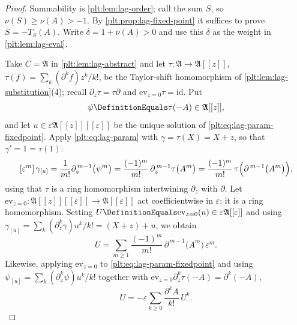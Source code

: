 \documentclass[11pt,oneside]{article}
\theoremstyle{plain}
\theoremstyle{definition}
\theoremstyle{remark}
\begin{document}
\begin{proof}
Summability is \cref{plt:lem:lag-order}; call the sum \(S\), so
\(\nu(S)\ge\nu(A)>-1\).  By \cref{plt:prop:lag-fixed-point} it suffices to
prove \(S=-T_S(A)\).  Write \(\delta=1+\nu(A)>0\) and use this \(\delta\) as
the weight in \cref{plt:lem:lag-eval}.

Take \(C=\mathfrak A\) in \cref{plt:lem:lag-abstract} and let
\(\tau\colon\mathfrak A\to\mathfrak A[[z]]\),
\(\tau(f)=\sum_k(\partial^kf)z^k/k!\), be the Taylor-shift homomorphism of
\cref{plt:lem:lag-substitution}(4); recall \(\partial_z\tau=\tau\partial\) and
\(\mathrm{ev}_{z=0}\tau=\mathrm{id}\).  Put
\[
  \psi\DefinitionEquals\tau(-A)\in\mathfrak A[[z]],
\]
and let \(u\in\varepsilon\mathfrak A[[z]][[\varepsilon]]\) be the unique solution
of \cref{plt:eq:lag-param-fixedpoint}.  Apply
\cref{plt:eq:lag-param} with \(\gamma=\tau(X)=X+z\), so that
\(\gamma'=1=\tau(1)\):
\[
  [\varepsilon^m]\,\gamma_{[u]}
  =\frac1{m!}\partial_z^{\,m-1}\bigl(\psi^m\bigr)
  =\frac{(-1)^m}{m!}\,\partial_z^{\,m-1}\tau\bigl(A^m\bigr)
  =\frac{(-1)^m}{m!}\,\tau\Bigl(\partial^{\,m-1}\bigl(A^m\bigr)\Bigr),
\]
using that \(\tau\) is a ring homomorphism intertwining \(\partial_z\) with
\(\partial\).  Let
\(\mathrm{ev}_{z=0}\colon\mathfrak A[[z]][[\varepsilon]]\to\mathfrak
A[[\varepsilon]]\) act coefficientwise in \(\varepsilon\); it is a ring
homomorphism.  Setting \(U\DefinitionEquals\mathrm{ev}_{z=0}(u)\in
\varepsilon\mathfrak A[[\varepsilon]]\) and using
\(\gamma_{[u]}=\sum_k(\partial_z^k\gamma)u^k/k!=(X+z)+u\), we obtain
\begin{equation}
\label{plt:eq:lag-U}
  U=\sum_{m\ge1}\frac{(-1)^m}{m!}\,\partial^{\,m-1}\bigl(A^m\bigr)\,\varepsilon^m .
\end{equation}
Likewise, applying \(\mathrm{ev}_{z=0}\) to
\cref{plt:eq:lag-param-fixedpoint} and using
\(\psi_{[u]}=\sum_k(\partial_z^k\psi)u^k/k!\) together with
\(\mathrm{ev}_{z=0}\partial_z^k\tau(-A)=\partial^k(-A)\),
\begin{equation}
\label{plt:eq:lag-Ufix}
  U=-\varepsilon\sum_{k\ge0}\frac{\partial^kA}{k!}\,U^k .
\end{equation}


\end{proof}
\end{document}
